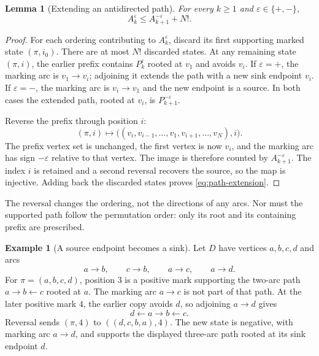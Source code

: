 \documentclass[11pt]{article}
\numberwithin{equation}{section}
\newtheorem{lemma}[theorem]{Lemma}
\theoremstyle{definition}
\newtheorem{example}[theorem]{Example}
\begin{document}
\begin{lemma}[Extending an antidirected path]
\label{lem:path-extension}
For every $k\geq1$ and $\varepsilon\in\{+,-\}$,
\begin{equation}
 A_k^\varepsilon\leq A_{k+1}^{-\varepsilon}+N!.
 \label{eq:path-extension}
\end{equation}
\end{lemma}

\begin{proof}
For each ordering contributing to $A_k^\varepsilon$, discard its
first supporting marked state $(\pi,i_0)$.  There are at most $N!$
discarded states.  At any remaining state $(\pi,i)$, the earlier
prefix contains $P_k^\varepsilon$ rooted at $v_1$ and avoids $v_i$.
If $\varepsilon=+$, the marking arc is $v_1\to v_i$; adjoining it
extends the path with a new sink endpoint $v_i$.  If
$\varepsilon=-$, the marking arc is $v_i\to v_1$ and the new
endpoint is a source.  In both cases the extended path, rooted at
$v_i$, is $P_{k+1}^{-\varepsilon}$.

Reverse the prefix through position $i$:
\begin{equation}
 (\pi,i)\longmapsto
 \bigl((v_i,v_{i-1},\ldots,v_1,v_{i+1},\ldots,v_N),i\bigr).
 \label{eq:path-reversal}
\end{equation}
The prefix vertex set is unchanged, the first vertex is now $v_i$,
and the marking arc has sign $-\varepsilon$ relative to that vertex.
The image is therefore counted by $A_{k+1}^{-\varepsilon}$.
The index $i$ is retained and a second reversal recovers the source,
so the map is injective.  Adding back the discarded states proves
\eqref{eq:path-extension}.
\end{proof}

The reversal changes the ordering, not the directions of any arcs.
Nor must the supported path follow the permutation order: only its
root and its containing prefix are prescribed.

\begin{example}[A source endpoint becomes a sink]
Let $D$ have vertices $a,b,c,d$ and arcs
\[
 a\to b,\qquad c\to b,\qquad a\to c,\qquad a\to d.
\]
For $\pi=(a,b,c,d)$, position $3$ is a positive mark supporting the
two-arc path $a\to b\leftarrow c$ rooted at $a$.  The marking arc
$a\to c$ is not part of that path.  At the later positive mark $4$,
the earlier copy avoids $d$, so adjoining $a\to d$ gives
\[
 d\leftarrow a\to b\leftarrow c.
\]
Reversal sends $(\pi,4)$ to $((d,c,b,a),4)$.  The new state is
negative, with marking arc $a\to d$, and supports the displayed
three-arc path rooted at its sink endpoint $d$.
\end{example}
\end{document}
